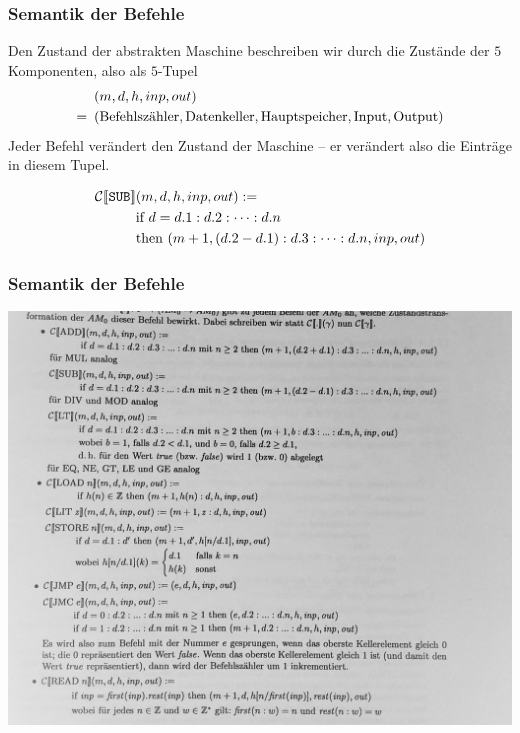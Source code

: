 \documentclass{beamer}
\begin{document}
\begin{frame} \frametitle{Semantik der Befehle}
	Den Zustand der abstrakten Maschine beschreiben wir durch die Zustände der $5$ Komponenten, also als $5$-Tupel
	\begin{align*}
		&(m,d,h,inp,out)\\
		= \enskip &(\text{Befehlszähler}, \text{Datenkeller}, \text{Hauptspeicher}, \text{Input}, \text{Output})
	\end{align*}
	Jeder Befehl verändert den Zustand der Maschine -- er verändert also die Einträge in diesem Tupel.
	
	\begin{align*}
		\mathcal{C} [\![ \texttt{SUB} ]\!] &(m,d,h,inp,out) \mathrel{:=}  \\
		&\text{if } d = d.1 : d.2 : \dots : d.n \\
		&\text{then } (m+1, (d.2 - d.1) : d.3 : \dots : d.n, inp, out)
	\end{align*}
\end{frame}

\begin{frame} \frametitle{Semantik der Befehle}
	\includegraphics[height=\textheight]{tut10-AM0Semantik.jpg}
\end{frame}
\end{document}
